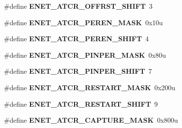 \begin{DoxyCompactItemize}
\item 
\#define {\bfseries E\+N\+E\+T\+\_\+\+A\+T\+C\+R\+\_\+\+O\+F\+F\+R\+S\+T\+\_\+\+S\+H\+I\+FT}~3\hypertarget{group__ENET__Register__Masks_gaeee97384c53d1b0f6cd3780fd1d2f1db}{}\label{group__ENET__Register__Masks_gaeee97384c53d1b0f6cd3780fd1d2f1db}

\item 
\#define {\bfseries E\+N\+E\+T\+\_\+\+A\+T\+C\+R\+\_\+\+P\+E\+R\+E\+N\+\_\+\+M\+A\+SK}~0x10u\hypertarget{group__ENET__Register__Masks_ga6c11ce9b10275a6765a5ede784b2bf1f}{}\label{group__ENET__Register__Masks_ga6c11ce9b10275a6765a5ede784b2bf1f}

\item 
\#define {\bfseries E\+N\+E\+T\+\_\+\+A\+T\+C\+R\+\_\+\+P\+E\+R\+E\+N\+\_\+\+S\+H\+I\+FT}~4\hypertarget{group__ENET__Register__Masks_gaa3174823ddaff2166b78849f64a51785}{}\label{group__ENET__Register__Masks_gaa3174823ddaff2166b78849f64a51785}

\item 
\#define {\bfseries E\+N\+E\+T\+\_\+\+A\+T\+C\+R\+\_\+\+P\+I\+N\+P\+E\+R\+\_\+\+M\+A\+SK}~0x80u\hypertarget{group__ENET__Register__Masks_ga77bb996851465816022bc4775156bcfc}{}\label{group__ENET__Register__Masks_ga77bb996851465816022bc4775156bcfc}

\item 
\#define {\bfseries E\+N\+E\+T\+\_\+\+A\+T\+C\+R\+\_\+\+P\+I\+N\+P\+E\+R\+\_\+\+S\+H\+I\+FT}~7\hypertarget{group__ENET__Register__Masks_ga132378b49192464e6f7f3246b9c07d11}{}\label{group__ENET__Register__Masks_ga132378b49192464e6f7f3246b9c07d11}

\item 
\#define {\bfseries E\+N\+E\+T\+\_\+\+A\+T\+C\+R\+\_\+\+R\+E\+S\+T\+A\+R\+T\+\_\+\+M\+A\+SK}~0x200u\hypertarget{group__ENET__Register__Masks_ga3a0c41e65b6be0a4ecf7952cd4ba33a9}{}\label{group__ENET__Register__Masks_ga3a0c41e65b6be0a4ecf7952cd4ba33a9}

\item 
\#define {\bfseries E\+N\+E\+T\+\_\+\+A\+T\+C\+R\+\_\+\+R\+E\+S\+T\+A\+R\+T\+\_\+\+S\+H\+I\+FT}~9\hypertarget{group__ENET__Register__Masks_ga5920e6dc52564ba30bf8426b5cc14071}{}\label{group__ENET__Register__Masks_ga5920e6dc52564ba30bf8426b5cc14071}

\item 
\#define {\bfseries E\+N\+E\+T\+\_\+\+A\+T\+C\+R\+\_\+\+C\+A\+P\+T\+U\+R\+E\+\_\+\+M\+A\+SK}~0x800u\hypertarget{group__ENET__Register__Masks_gacd8fe80e2e9c0c195beaf224632d0e65}{}\label{group__ENET__Register__Masks_gacd8fe80e2e9c0c195beaf224632d0e65}


\end{DoxyCompactItemize}
